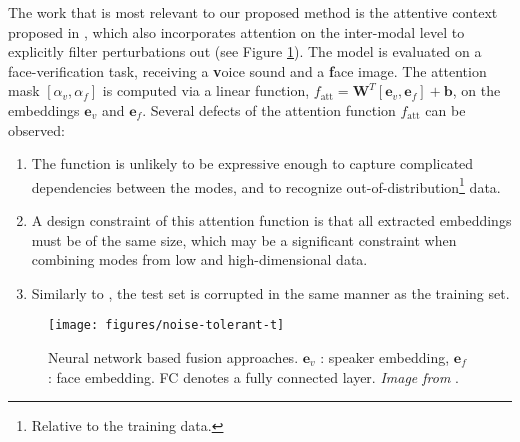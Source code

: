 The work that is most relevant to our proposed method is the attentive context proposed in \citep{audiovisual-attention}, which also incorporates attention on the inter-modal level to explicitly filter perturbations out (see Figure \ref{fig:noise-tolerant}). The model is evaluated on a face-verification task, receiving a \textbf{v}oice sound and a \textbf{f}ace image. The attention mask $[\alpha_v,\alpha_f]$ is computed via a linear function, $f_{\text{att}} = \mathbf{W}^T[\mathbf{e}_v, \mathbf{e}_f] + \mathbf{b}$, on the embeddings $\mathbf{e}_v$ and $\mathbf{e}_f$. Several defects of the attention function $f_{\text{att}}$ can be observed: 
\begin{enumerate}
\item The function is unlikely to be expressive enough to capture complicated dependencies between the modes, and to recognize out-of-distribution\footnote{Relative to the training data.} data.
\item A design constraint of this attention function is that all extracted embeddings must be of the same size, which may be a significant constraint when combining modes from low and high-dimensional data.
\item Similarly to \citep{afouras}, the test set is corrupted in the same manner as the training set.
\end{enumerate}

\begin{figure}[!ht]
\centering
\texttt{[image: figures/noise-tolerant-t]}
\caption[Noise-tolerant fusion model]{Neural network based fusion approaches. $\mathbf{e}_v$ : speaker embedding, $\mathbf{e}_f$ : face embedding. FC denotes a fully connected layer. \textit{Image from} \citep{audiovisual-attention}.}
\label{fig:noise-tolerant}
\end{figure}



